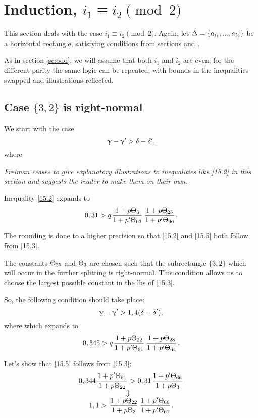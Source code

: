 \section{Induction, $i_1 \equiv i_2 \pmod 2$}

This section deals with the case $i_1 \equiv i_2 \pmod 2$.
Again, let $\Delta = \{ a_{i_1}, ..., a_{i_2}\}$ be a horizontal rectangle,
satisfying conditions from sections  and .

As in section \ref{sc:odd}, we will assume that both $i_1$ and $i_2$ are even;
for the different parity the same logic can be repeated,
with bounds in the inequalities swapped and illustrations reflected.

\subsection{Case $\{3,2\}$ is right-normal}

We start with the case
\begin{equation}\label{15.2}
	\upgamma - \upgamma' > \delta - \delta',
\end{equation}
where

\textit{
	Freiman ceases to give explanatory illustrations to inequalities like \ref{15.2} in this section
	and suggests the reader to make them on their own.
}

Inequality \ref{15.2} expands to
\begin{equation}\label{15.3}
	0,31 > q \up{3}{63} \up{25}{66}.
\end{equation}

The rounding is done to a higher precision
so that \ref{15.2} and \ref{15.5} both follow from \ref{15.3}.

The constants $\Theta_{25}$ and $\Theta_{3}$ are chosen such that the subrectangle $\{3,2\}$
which will occur in the further splitting is right-normal.
This condition allows us to choose the largest possible constant in the lhs of \ref{15.3}.

So, the following condition should take place:
\begin{equation}\label{15.4}
	\upgamma - \upgamma' > 1,4(\delta - \delta'),
\end{equation}
where
which expands to
\begin{equation}\label{15.5}
	0,345 > q \up{22}{61} \up{28}{64}.
\end{equation}

Let's show that \ref{15.5} follows from \ref{15.3}:
\begin{gather}\label{15.6}
	0,344 \pu{61}{22} > 0,31 \pu{66}{3}\\
	\ArrowBetweenLines
	1,1 > \uu{22}{3} \pp{66}{61}.
\end{gather}

